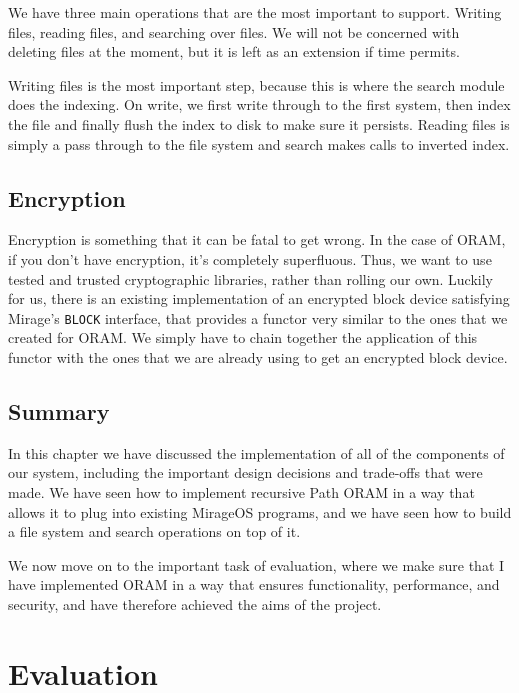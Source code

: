\documentclass[12pt,a4paper,twoside,openright]{report}
\begin{document}
We have three main operations that are the most important to support. Writing files, reading files, and searching over files. We will not be concerned with deleting files at the moment, but it is left as an extension if time permits.

Writing files is the most important step, because this is where the search module does the indexing. On write, we first write through to the first system, then index the file and finally flush the index to disk to make sure it persists. Reading files is simply a pass through to the file system and search makes calls to inverted index.

\section{Encryption}
\label{sec:encryption}

Encryption is something that it can be fatal to get wrong. In the case of ORAM, if you don't have encryption, it's completely superfluous. Thus, we want to use tested and trusted cryptographic libraries, rather than rolling our own. Luckily for us, there is an existing implementation of an encrypted block device satisfying Mirage's \texttt{BLOCK} interface, that provides a functor very similar to the ones that we created for ORAM. We simply have to chain together the application of this functor with the ones that we are already using to get an encrypted block device.

\section{Summary}
\label{sec:implSummary}

In this chapter we have discussed the implementation of all of the components of our system, including the important design decisions and trade-offs that were made. We have seen how to implement recursive Path ORAM in a way that allows it to plug into existing MirageOS programs, and we have seen how to build a file system and search operations on top of it.

We now move on to the important task of evaluation, where we make sure that I have implemented ORAM in a way that ensures functionality, performance, and security, and have therefore achieved the aims of the project.

\chapter{Evaluation}
\end{document}
